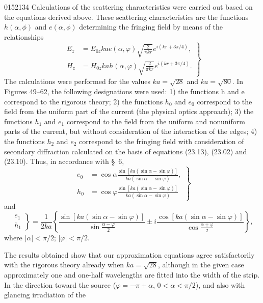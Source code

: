 \begin{scanpage}{0152}{134}
Calculations of the scattering characteristics were carried out based on the equations derived above. These scattering characteristics are the functions $h(\alpha,\phi)$ and $e(\alpha,\phi)$ determining the fringing field by means of the relationships
\[
\left.\begin{aligned}E_z&=E_{0z}kae(\alpha,\varphi)\sqrt{\frac2{\pi kr}}e^{i(kr+3\pi/4)},\\
H_z&=H_{0z}kah(\alpha,\varphi)\sqrt{\frac2{\pi kr}}e^{i(kr+3\pi/4)}.
\end{aligned}\right\}\tag{23.13}
\]
The calculations were performed for the values $ka=\sqrt{28}$ and $ka=\sqrt{80}$. In Figures 49--62, the following designations were used: 1) the functions h and e correspond to the rigorous theory; 2) the functions $h_0$ and $e_0$ correspond to the field from the uniform part of the current (the physical optics approach); 3) the functions $h_1$ and $e_1$ correspond to the field from the uniform and nonuniform parts of the current, but without consideration of the interaction of the edges; 4) the functions $h_2$ and $e_2$ correspond to the fringing field with consideration of secondary diffraction calculated on the basis of equations (23.13), (23.02) and (23.10). Thus, in accordance with \S~6,
\[
\left.\begin{aligned}e_0&=\cos\alpha\frac{\sin[ka(\sin\alpha-\sin\varphi)]}{ka(\sin\alpha-\sin\varphi)},\\
h_0&=\cos\varphi\frac{\sin[ka(\sin\alpha-\sin\varphi)]}{ka(\sin\alpha-\sin\varphi)}
\end{aligned}\right\}\tag{23.14}
\]
and
\[
\left.\begin{matrix}e_1\\h_1\end{matrix}\right\}=\frac1{2ka}\left\{\frac{\sin[ka(\sin\alpha-\sin\varphi)]}{\sin\frac{\alpha-\varphi}{2}}\pm i\frac{\cos[ka(\sin\alpha-\sin\varphi)]}{\cos\frac{\alpha+\varphi}{2}}\right\},\tag{23.15}
\]
where $|\alpha|<\pi/2$; $|\varphi|<\pi/2$.

The results obtained show that our approximation equations agree satisfactorily with the rigorous theory already when $ka=\sqrt{28}$, although in the given case approximately one and one-half wavelengths are fitted into the width of the strip. In the direction toward the source ($\varphi=-\pi+\alpha$, $0<\alpha<\pi/2$), and also with glancing irradiation of the
\end{scanpage}
